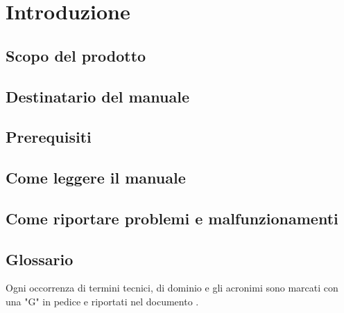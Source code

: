 \section{Introduzione}

\subsection{Scopo del prodotto}
\ScopoDelProdotto 

\subsection{Destinatario del manuale}

\subsection{Prerequisiti}

\subsection{Come leggere il manuale}

\subsection{Come riportare problemi e malfunzionamenti}




	

\subsection{Glossario}
Ogni occorrenza di termini tecnici, di dominio e gli acronimi sono marcati con una "G" in pedice e riportati nel documento \Glossario{}.

	

